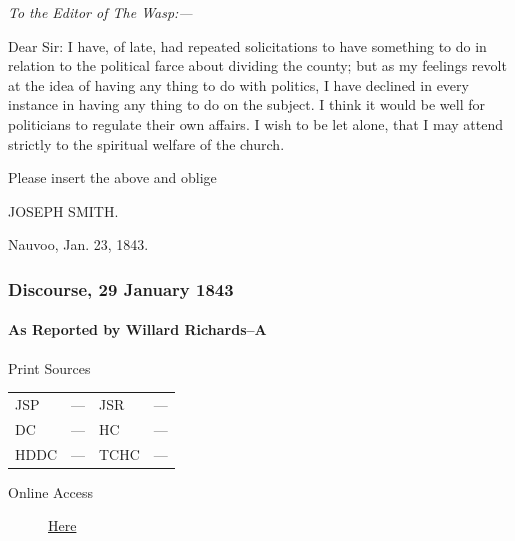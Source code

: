 				\textit{To the Editor of The Wasp:---}

				Dear Sir: I have, of late, had repeated solicitations to have something to do in relation to the political farce about dividing the county; but as my feelings revolt at the idea of having any thing to do with politics, I have declined in every instance in having any thing to do on the subject. I think it would be well for politicians to regulate their own affairs. I wish to be let alone, that I may attend strictly to the spiritual welfare of the church.

				Please insert the above and oblige

				\begin{tightright}
					JOSEPH SMITH.
				\end{tightright}

				Nauvoo, Jan. 23, 1843.

		\subsubsection{Discourse, 29 January 1843}
			\label{EMS-1843-JS-29-JAN-1843}
			
			\paragraph{As Reported by Willard Richards--A}
				\label{EMS-1843-JS-29-JAN-1843-WR-A}
			
				\begin{description}
					\item[Print Sources]
				\end{description}

					\begin{tabular}{p{0.5in}p{1in}p{0.5in}p{1in}}
					JSP	 	& ---		& JSR 		& --- \\
					DC	 	& ---		& HC 		& --- \\
					HDDC 	& ---		& TCHC 		& --- \\
					\end{tabular}
				
				\begin{description}
					\item[Online Access] \href{https://www.josephsmithpapers.org/paper-summary/discourse-29-january-1843-as-reported-by-willard-richards-a/1}{Here}
				\end{description}
				
